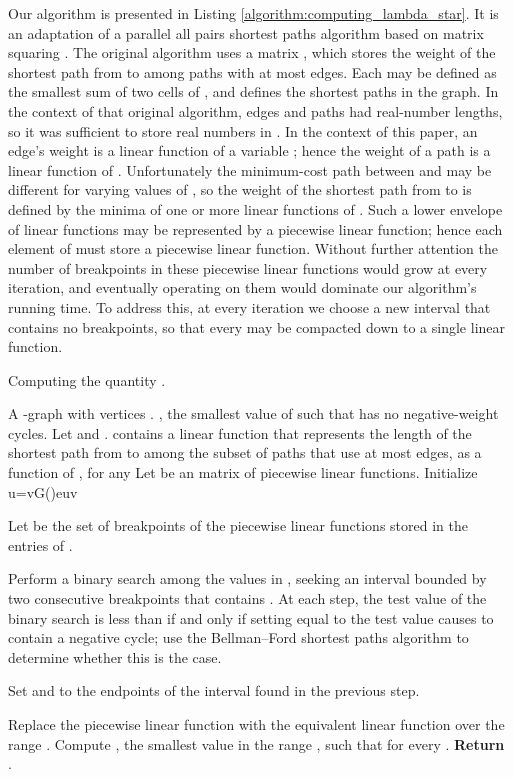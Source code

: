 \documentclass{llncs}
\begin{document}
Our algorithm is presented in Listing \ref{algorithm:computing_lambda_star}.  It is an adaptation of a parallel all pairs shortest paths algorithm based on matrix squaring \cite{savage77}.  The original algorithm uses a matrix , which stores the weight of the shortest path from  to  among paths with at most  edges.  Each  may be defined as the smallest sum of two cells of , and  defines the shortest paths in the graph.  In the context of that original algorithm, edges and paths had real-number lengths, so it was sufficient to store real numbers in .  In the context of this paper, an edge's weight is a linear function of a variable ; hence the weight of a path is a linear function of .  Unfortunately the minimum-cost path between  and  may be different for varying values of , so the weight of the shortest path from  to  is defined by the minima of one or more linear functions of .  Such a lower envelope of linear functions may be represented by a piecewise linear function; hence each element of  must store a piecewise linear function.  Without further attention the number of breakpoints in these piecewise linear functions would grow at every iteration, and eventually operating on them would dominate our algorithm's running time.  To address this, at every iteration we choose a new interval  that contains no breakpoints, so that every  may be compacted down to a single linear function.

\begin{algorithm}[p]
\caption{Computing the quantity .}
\label{algorithm:computing_lambda_star}
\begin{algorithmic}[1]
 A -graph  with  vertices .
 , the smallest value of  such that  has no negative-weight cycles.
\STATE Let  and .
  contains a linear function that represents the length of the shortest path from  to  among the subset of paths that use at most  edges, as a function of , for any 
\STATE Let  be an  matrix of piecewise linear functions.
\STATE Initialize u=vG(\lambda)euv
\FOR{  }
  \FOR{  }
    \STATE  \label{line:define_D}
  \ENDFOR

  \STATE Let  be the set of breakpoints of the piecewise linear functions stored in the entries of .

  \STATE Perform a binary search among the values in , seeking an interval bounded by two consecutive breakpoints that contains . At each step, the test value of the binary search is less than  if and only if setting  equal to the test value causes  to contain a negative cycle; use the Bellman--Ford shortest paths algorithm to determine whether this is the case.

  \STATE Set  and  to the endpoints of the interval found in the previous step.

  \FOR{  }
    \STATE Replace the piecewise linear function  with the equivalent linear function over the range . \label{line:simplify_D}
  \ENDFOR  
\ENDFOR
\STATE Compute , the smallest value in the range , such that  for every .
\STATE \textbf{Return} .
\end{algorithmic}
\end{algorithm}
\end{document}
